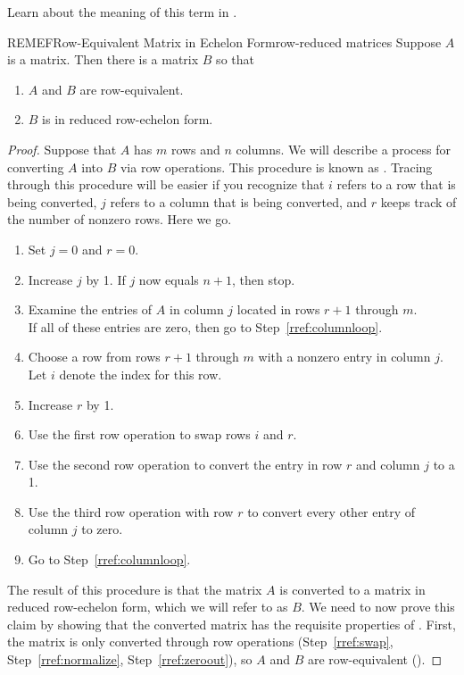 {Learn about the meaning of this term in .}
%
\begin{theorem}{REMEF}{Row-Equivalent Matrix in Echelon Form}{row-reduced matrices}
Suppose $A$ is a matrix.  Then there is a matrix $B$ so that
\begin{enumerate}
\item $A$ and $B$ are row-equivalent.
\item $B$ is in reduced row-echelon form.
\end{enumerate}
\end{theorem}
%
\begin{proof}
Suppose that $A$ has $m$ rows and $n$ columns.  We will describe a process for converting $A$ into $B$ via row operations.  This procedure is known as .  Tracing through this procedure will be easier if you recognize that $i$ refers to a row that is being converted, $j$ refers to a column that is being converted, and $r$ keeps track of the number of nonzero rows.  Here we go.\par
%
\begin{enumerate}
%
\item\label{rref:initialize}
Set $j=0$ and $r=0$.
%
\item\label{rref:columnloop}
Increase $j$ by 1.  If $j$ now equals $n+1$, then stop.
%
\item\label{rref:locate}
Examine the entries of $A$ in column $j$ located in rows $r+1$ through $m$.\\
If all of these entries are zero, then go to Step~\ref{rref:columnloop}.  
%
\item\label{rref:rowchoice}
Choose a row from rows $r+1$ through $m$ with a nonzero entry in column $j$.\\
Let $i$ denote the index for this row.
%
\item\label{rref:incrementrank} 
Increase $r$ by 1.
%
\item\label{rref:swap} 
Use the first row operation to swap rows $i$ and $r$.
%
\item\label{rref:normalize} 
Use the second row operation to convert the entry in row $r$ and column $j$ to a 1.
%
\item\label{rref:zeroout} 
Use the third row operation with row $r$ to convert every other entry of column $j$ to zero.
%
\item\label{rref:columnloopreturn}
Go to Step~\ref{rref:columnloop}.
%
\end{enumerate}
%
The result of this procedure is that the matrix $A$ is converted to a matrix in reduced row-echelon form, which we will refer to as $B$.  We need to now prove this claim by showing that the converted matrix has the requisite properties of .  First, the matrix is only converted through row operations (Step~\ref{rref:swap}, Step~\ref{rref:normalize}, Step~\ref{rref:zeroout}), so $A$ and $B$ are row-equivalent ().\par

\end{proof}
